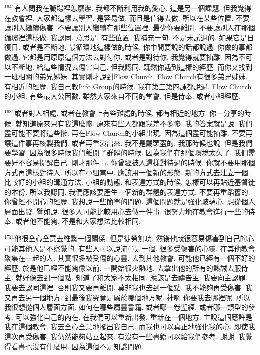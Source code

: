 \documentclass{book}
\begin{document}
$^{1641}$有人問我在職場裡怎麼辦.
我都不斷利用我的愛心.
這是另一個課題.
但我覺得在教會裡.
大家都這樣去學習.
是容易做.
而且是值得去做.
所以在某些位置.
不要讓別人繼續傷害.
不要讓別人繼續在那些位置裡.
最少你要離開.
不要讓別人在那個循環裡這樣做.
我認同.
意思是.
有些位置.
我補充一句.
不是未試過的.
如果它是日復日.
或者是不斷地.
最循環地這樣做的時候.
你中間要說的話都說過.
你做的事都做過.
它都是用原原這個方法去對付你.
或者是對待你.
我覺得就要抽離.
因為不可以不斷地.
給這些情況去傷害自己.
但我認同.
既然你遇到這樣的經歷.
而你又找到一班相關的弟兄姊妹.
其實剛才說到Flow Church.
Flow Church有很多弟兄姊妹.
有相近的經歷.
我自己教Info Group的時候.
我在第三第四課都說過.
Flow Church的小組.
有些最大公因數.
雖然大家來自不同的堂會.
但是侍奉.
或者小組經歷.

$^{1681}$或者對人相處.
或者在教會上有些難處的時候.
都有相近的地方.
你一分享的時候.
就知道原來只有我這麼慘.
原來有些人都跟我差不多慘.
我的答案就是說.
我們盡可能不要將這些慘.
再在Flow Church的小組出現.
因為這個盡可能抽離.
不要再讓這件事再核製我們.
或者再重演出來.
我不是戴頭盔的.
我那時候也說.
但是我們要學習.
因為很多時候我們離開了群體的時候.
因為我們在那個環境太久了.
我們需要好不容易提醒自己.
剛才那件事.
你曾經被人這樣對待過的時候.
你就不要用那個方式再這樣對待人.
所以在小組當中.
應該用一個新的形態.
新的方式去建立一個.
比較好的小組的溝通方法.
小組的動態.
和表達方式的時候.
怎樣可以再貼近基督徒的本份.
所以我認同.
我們應該要產生一個新的群體的表達方式.
不要再重蹈舊的.
你曾經不開心的經歷.
我想說一些簡單的問題.
這個問題就是強化玻璃心.
想從個人層面出發.
譬如說.
很多人可能比較用心去做一件事.
很努力地在教會進行一些的侍奉.
或者他不能夠.
不是和大家想法比較相同.

$^{1721}$他很全心全意去維繫一個關係.
但是徒勞無功.
然後他就很容易傷害到自己的心.
可能其他人是不察覺的.
有些人可以說流童是一個.
很多受傷害的心靈.
在其他教會聚集在一起的人.
其實很多被受傷的心靈.
去到其他教會.
可能他已經有一個不好的經歷.
於是他已經不能夠像以前.
一開始很火熱地.
去拿出他的所有的熱誠去服侍主.
就好像去到一個點.
知道了和大家不太相同.
應該是去禱告主.
我要向主認罪.
我要去認同這裡.
否則我又要再離開.
莫非我也去到一個點.
我不能夠再受傷害.
我又再去另一個地方.
到最後我究竟是屬於哪個地方呢.
神啊 你要我去哪裡呢.
所以我很想從個人層面方面.
如何在哪些屬靈書籍.
或者哪一卷聖經.
或者哪一類型的參考.
可以強化自己的內在.
在我們可以重新出發.
重新在一個地方.
主說這個應許是我在這個教會.
我去全心全意地擺出我自己.
而我也可以真正地強化我的心.
即使我這次再受傷害.
我仍然能夠站立起來.
有沒有一些書籍可以給我們參考.
謝謝.
我覺得看書也沒有什麼用.
因為這個不是知識問題.
\end{document}
